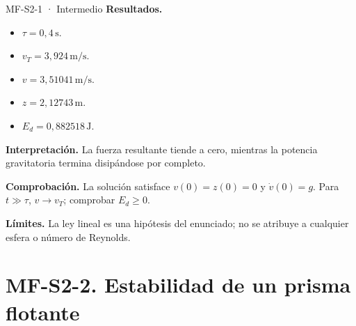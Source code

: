 \begin{studiumworked}{MF-S2-1 · Intermedio}
\textbf{Resultados.}\begin{itemize}

\item $\tau=0{,}4\,\mathrm{s}$.

\item $v_T=3{,}924\,\mathrm{m/s}$.

\item $v=3{,}51041\,\mathrm{m/s}$.

\item $z=2{,}12743\,\mathrm{m}$.

\item $E_d=0{,}882518\,\mathrm{J}$.

\end{itemize}

\textbf{Interpretación.} La fuerza resultante tiende a cero, mientras la potencia gravitatoria termina disipándose por completo.

\textbf{Comprobación.} La solución satisface $v(0)=z(0)=0$ y $\dot v(0)=g$. Para $t\gg\tau$, $v\to v_T$; comprobar $E_d\ge0$.

\textbf{Límites.} La ley lineal es una hipótesis del enunciado; no se atribuye a cualquier esfera o número de Reynolds.

\end{studiumworked}

\Needspace{.30\textheight}\section{MF-S2-2. Estabilidad de un prisma flotante}

